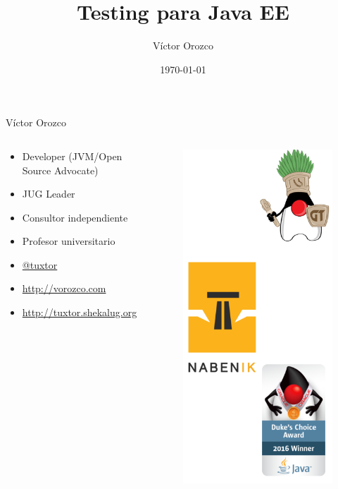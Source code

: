 \documentclass{beamer}
\title{Testing para Java EE}
\author{Víctor Orozco}
\institute{Nabenik}
\date{\today}
\begin{document}
\frame{\titlepage}


\begin{frame}{Víctor Orozco}
\begin{columns}[T] %
	\begin{column}[T]{5cm} %
		\begin{itemize}
			\item Developer (JVM/Open Source Advocate)
			\item JUG Leader
			\item Consultor independiente
			\item Profesor universitario
			\item \href{https://twitter.com/tuxtor}{@tuxtor}
			\item \href{http://vorozco.com}{http://vorozco.com}
			\item \href{http://tuxtor.shekalug.org}{http://tuxtor.shekalug.org} 
		\end{itemize}
	\end{column}
	\begin{column}[T]{5cm} %
		\begin{figure}
			\centering
			\includegraphics[width=0.6\linewidth]{Images/logos}
		\end{figure}
		
	\end{column}
\end{columns}
\end{frame}
\end{document}
